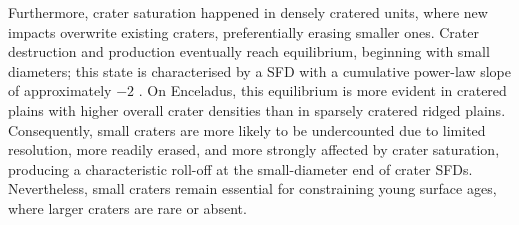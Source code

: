 \documentclass[preprint,11pt,3p,times,authoryear]{elsarticle}
\begin{document}
Furthermore, crater saturation happened in densely cratered units, where new impacts overwrite existing craters, preferentially erasing smaller ones. Crater destruction and production eventually reach equilibrium, beginning with small diameters; this state is characterised by a SFD with a cumulative power-law slope of approximately $-2$ \citep{Gault1970, Richardson2009}. On Enceladus, this equilibrium is more evident in cratered plains with higher overall crater densities than in sparsely cratered ridged plains. Consequently, small craters are more likely to be undercounted due to limited resolution, more readily erased, and more strongly affected by crater saturation, producing a characteristic roll-off at the small-diameter end of crater SFDs. Nevertheless, small craters remain essential for constraining young surface ages, where larger craters are rare or absent. \\
\end{document}
